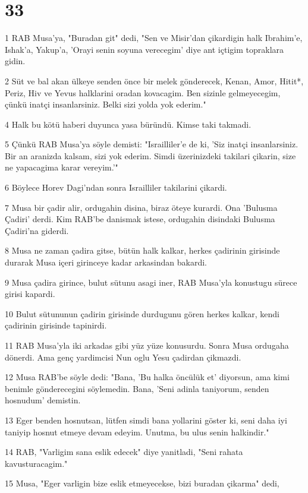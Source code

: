 \chapter{33}

\par 1 RAB Musa'ya, "Buradan git" dedi, "Sen ve Misir'dan çikardigin halk Ibrahim'e, Ishak'a, Yakup'a, 'Orayi senin soyuna verecegim' diye ant içtigim topraklara gidin.
\par 2 Süt ve bal akan ülkeye senden önce bir melek gönderecek, Kenan, Amor, Hitit*, Periz, Hiv ve Yevus halklarini oradan kovacagim. Ben sizinle gelmeyecegim, çünkü inatçi insanlarsiniz. Belki sizi yolda yok ederim."
\par 4 Halk bu kötü haberi duyunca yasa büründü. Kimse taki takmadi.
\par 5 Çünkü RAB Musa'ya söyle demisti: "Israilliler'e de ki, 'Siz inatçi insanlarsiniz. Bir an aranizda kalsam, sizi yok ederim. Simdi üzerinizdeki takilari çikarin, size ne yapacagima karar vereyim.'"
\par 6 Böylece Horev Dagi'ndan sonra Israilliler takilarini çikardi.
\par 7 Musa bir çadir alir, ordugahin disina, biraz öteye kurardi. Ona 'Bulusma Çadiri' derdi. Kim RAB'be danismak istese, ordugahin disindaki Bulusma Çadiri'na giderdi.
\par 8 Musa ne zaman çadira gitse, bütün halk kalkar, herkes çadirinin girisinde durarak Musa içeri girinceye kadar arkasindan bakardi.
\par 9 Musa çadira girince, bulut sütunu asagi iner, RAB Musa'yla konustugu sürece girisi kapardi.
\par 10 Bulut sütununun çadirin girisinde durdugunu gören herkes kalkar, kendi çadirinin girisinde tapinirdi.
\par 11 RAB Musa'yla iki arkadas gibi yüz yüze konusurdu. Sonra Musa ordugaha dönerdi. Ama genç yardimcisi Nun oglu Yesu çadirdan çikmazdi.
\par 12 Musa RAB'be söyle dedi: "Bana, 'Bu halka öncülük et' diyorsun, ama kimi benimle gönderecegini söylemedin. Bana, 'Seni adinla taniyorum, senden hosnudum' demistin.
\par 13 Eger benden hosnutsan, lütfen simdi bana yollarini göster ki, seni daha iyi taniyip hosnut etmeye devam edeyim. Unutma, bu ulus senin halkindir."
\par 14 RAB, "Varligim sana eslik edecek" diye yanitladi, "Seni rahata kavusturacagim."
\par 15 Musa, "Eger varligin bize eslik etmeyecekse, bizi buradan çikarma" dedi,

